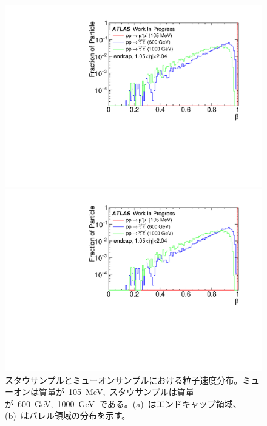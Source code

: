 \begin{figure}[H]
    \begin{minipage}{0.49\hsize}
    \centering   
    \includegraphics[width=\textwidth,page=1]{img/plot/beta.pdf}
    \subcaption{}
    \end{minipage}
    \begin{minipage}{0.49\hsize}
    \centering   
    \includegraphics[width=\textwidth,page=5]{img/plot/beta.pdf}
    \subcaption{}
    \end{minipage}
    \caption[スタウサンプルとミューオンサンプルにおける粒子速度分布]{スタウサンプルとミューオンサンプルにおける粒子速度分布。ミューオンは質量が~105~MeV,~スタウサンプルは質量が~600~GeV,~1000~GeV~である。(a)~はエンドキャップ領域、(b)~はバレル領域の分布を示す。}\label{fig:staud2}
\end{figure}

